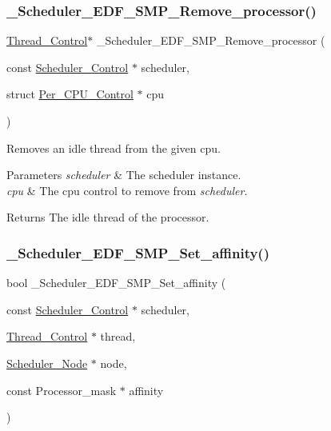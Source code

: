 \subsubsection{\texorpdfstring{\_Scheduler\_EDF\_SMP\_Remove\_processor()}{\_Scheduler\_EDF\_SMP\_Remove\_processor()}}
{\footnotesize\ttfamily \mbox{\hyperlink{struct__Thread__Control}{Thread\+\_\+\+Control}}$\ast$ \+\_\+\+Scheduler\+\_\+\+E\+D\+F\+\_\+\+S\+M\+P\+\_\+\+Remove\+\_\+processor (\begin{DoxyParamCaption}\item[{const \mbox{\hyperlink{struct__Scheduler__Control}{Scheduler\+\_\+\+Control}} $\ast$}]{scheduler,  }\item[{struct \mbox{\hyperlink{structPer__CPU__Control}{Per\+\_\+\+C\+P\+U\+\_\+\+Control}} $\ast$}]{cpu }\end{DoxyParamCaption})}



Removes an idle thread from the given cpu. 


\begin{DoxyParams}{Parameters}
{\em scheduler} & The scheduler instance. \\
\hline
{\em cpu} & The cpu control to remove from {\itshape scheduler}.\\
\hline
\end{DoxyParams}
\begin{DoxyReturn}{Returns}
The idle thread of the processor. 
\end{DoxyReturn}
\mbox{\label{group__RTEMSScoreSchedulerSMPEDF_ga12244678bacb0c36ab3cb6035336503d}} 
\subsubsection{\texorpdfstring{\_Scheduler\_EDF\_SMP\_Set\_affinity()}{\_Scheduler\_EDF\_SMP\_Set\_affinity()}}
{\footnotesize\ttfamily bool \+\_\+\+Scheduler\+\_\+\+E\+D\+F\+\_\+\+S\+M\+P\+\_\+\+Set\+\_\+affinity (\begin{DoxyParamCaption}\item[{const \mbox{\hyperlink{struct__Scheduler__Control}{Scheduler\+\_\+\+Control}} $\ast$}]{scheduler,  }\item[{\mbox{\hyperlink{struct__Thread__Control}{Thread\+\_\+\+Control}} $\ast$}]{thread,  }\item[{\mbox{\hyperlink{structScheduler__Node}{Scheduler\+\_\+\+Node}} $\ast$}]{node,  }\item[{const Processor\+\_\+mask $\ast$}]{affinity }\end{DoxyParamCaption})}




